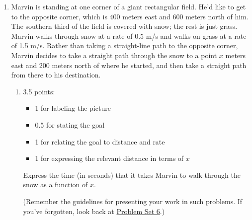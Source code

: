 \documentclass{article}
\begin{document}
\begin{enumerate}
\item 
  \begin{minipage}[t]{1.0\linewidth-2in}
    \setlength{\parskip}{8pt}
    Marvin is standing at one corner of a giant rectangular field. He'd like to get to the opposite corner, which is 400 meters east and 600 meters north of him. The southern third of the field is covered with snow; the rest is just grass. Marvin walks through snow at a rate of 0.5 m/s and walks on grass at a rate of 1.5 m/s. Rather than taking a straight-line path to the opposite corner, Marvin decides to take a straight path through the snow to a point $x$ meters east and 200 meters north of where he started, and then take a straight path from there to his destination. 
  \end{minipage}
  \hfill
  \parbox[t]{1.5in}{
    \vspace{0pt}
  }    


  \pspace{\newpage}

  \begin{enumerate}
  \item
    \begin{grading}
      3.5 points:
      \begin{itemize}[nosep]
      \item 1 for labeling the picture
      \item 0.5 for stating the goal
      \item 1 for relating the goal to distance and rate
      \item 1 for expressing the relevant distance in terms of $x$
      \end{itemize}
    \end{grading}

    \begin{problem}[\vfill]
      Express the time (in seconds) that it takes Marvin to walk through the snow as a function of $x$. 

      (Remember the guidelines for presenting your work in such problems. If you've forgotten, look back at \href{https://people.math.harvard.edu/~jjchen/mathma/docs/homework/PS06.html}{Problem Set 6}.)
    \end{problem}


\end{enumerate}
\end{enumerate}
\end{document}
